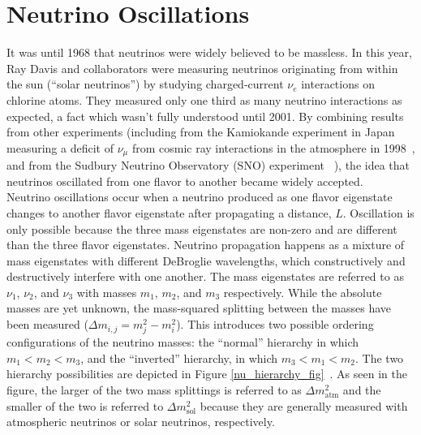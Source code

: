 \section{Neutrino Oscillations}
It was until 1968 that neutrinos were widely believed to be massless. In this year, Ray Davis and collaborators were measuring neutrinos originating from within the sun (``solar neutrinos'') by studying charged-current $\nu_e$ interactions on chlorine atoms. They measured only one third as many neutrino interactions as expected, a fact which wasn't fully understood until 2001. By combining results from other experiments (including from the Kamiokande experiment in Japan measuring a deficit of $\nu_\mu$ from cosmic ray interactions in the atmosphere in 1998~\cite{KamiokandeOscsource}, and from the Sudbury Neutrino Observatory (SNO) experiment ~\cite{SNOOscsource}), the idea that neutrinos oscillated from one flavor to another became widely accepted.\\

Neutrino oscillations occur when a neutrino produced as one flavor eigenstate changes to another flavor eigenstate after propagating a distance, $L$. Oscillation is only possible because the three mass eigenstates are non-zero and are different than the three flavor eigenstates. Neutrino propagation happens as a mixture of mass eigenstates with different DeBroglie wavelengths, which constructively and destructively interfere with one another. The mass eigenstates are referred to as $\nu_1$, $\nu_2$, and $\nu_3$ with masses $m_1$, $m_2$, and $m_3$ respectively. While the absolute masses are yet unknown, the mass-squared splitting between the masses have been measured ($\Delta m_{i,j} = m_j^2-m_i^2$). This introduces two possible ordering configurations of the neutrino masses: the ``normal'' hierarchy in which $m_1<m_2<m_3$, and the ``inverted'' hierarchy, in which $m_3<m_1<m_2$. The two hierarchy possibilities are depicted in Figure \ref{nu_hierarchy_fig}~\cite{HierarchyFigsource}. As seen in the figure, the larger of the two mass splittings is referred to as $\Delta m^2_{\text{atm}}$ and the smaller of the two is referred to $\Delta m^2_{\text{sol}}$ because they are generally measured with atmospheric neutrinos or solar neutrinos, respectively.\\

